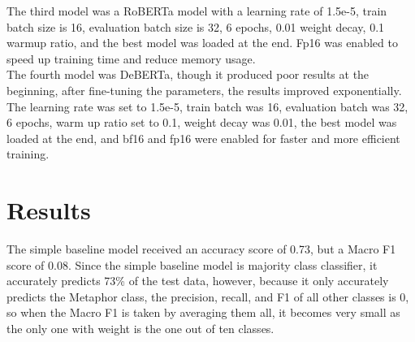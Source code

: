 \documentclass[11pt]{article}
\begin{document}
  The third model was a RoBERTa model with a learning rate of 1.5e-5, train batch 
  size is 16, evaluation batch size is 32, 6 epochs, 0.01 weight decay, 0.1 warmup 
  ratio, and the best model was loaded at the end. Fp16 was enabled to speed up 
  training time and reduce memory usage. \\
	
  The fourth model was DeBERTa, though it produced poor results at the beginning, 
  after fine-tuning the parameters, the results improved exponentially. The learning
   rate was set to 1.5e-5, train batch was 16, evaluation batch was 32, 6 epochs, 
   warm up ratio set to 0.1, weight decay was 0.01, the best model was loaded at the 
   end, and bf16 and fp16 were enabled for faster and more efficient training. \\


\begin{table}[htbp]
\centering
\caption{Hyperparameter Configurations for Transformer Models}
\label{tab:hyperparameters}
\end{table}
\section{Results}

The simple baseline model received an accuracy score of 0.73, but a Macro F1
 score of 0.08. Since the simple baseline model is majority class classifier, 
 it accurately predicts 73\% of the test data, however, because it only accurately 
 predicts the Metaphor class, the precision, recall, and F1 of all other classes is 0, 
 so when the Macro F1 is taken by averaging them all, it becomes very small as the only 
 one with weight is the one out of ten classes. \\
\end{document}
